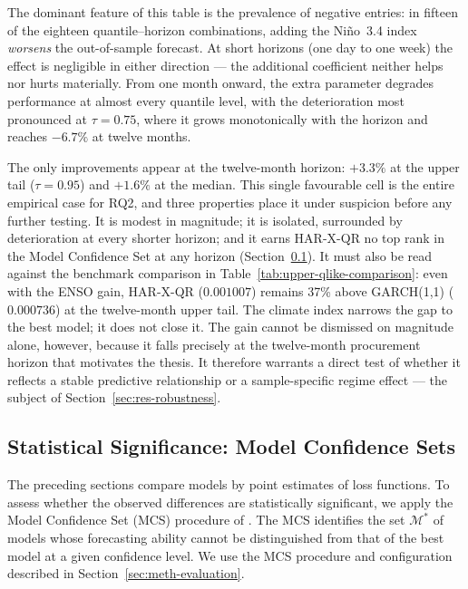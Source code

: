The dominant feature of this table is the prevalence of negative entries:
in fifteen of the eighteen quantile--horizon combinations, adding the
Ni\~no~3.4 index \emph{worsens} the out-of-sample forecast. At short
horizons (one day to one week) the effect is negligible in either
direction --- the additional coefficient neither helps nor hurts
materially. From one month onward, the extra parameter degrades
performance at almost every quantile level, with the deterioration most
pronounced at $\tau = 0.75$, where it grows monotonically with the
horizon and reaches $-6.7\%$ at twelve months.

The only improvements appear at the twelve-month horizon: $+3.3\%$ at the
upper tail ($\tau = 0.95$) and $+1.6\%$ at the median. This single
favourable cell is the entire empirical case for RQ2, and three
properties place it under suspicion before any further testing. It is
modest in magnitude; it is isolated, surrounded by deterioration at every
shorter horizon; and it earns HAR-X-QR no top rank in the Model
Confidence Set at any horizon (Section~\ref{sec:res-mcs}). It must also
be read against the benchmark comparison in
Table~\ref{tab:upper-qlike-comparison}: even with the ENSO gain, HAR-X-QR
($0.001007$) remains 37\% above GARCH(1,1) ($0.000736$) at the
twelve-month upper tail. The climate index narrows the gap to the best
model; it does not close it. The gain cannot be dismissed on magnitude
alone, however, because it falls precisely at the twelve-month
procurement horizon that motivates the thesis. It therefore warrants a
direct test of whether it reflects a stable predictive relationship or a
sample-specific regime effect --- the subject of
Section~\ref{sec:res-robustness}.

\subsection{Statistical Significance: Model Confidence Sets}
\label{sec:res-mcs}

The preceding sections compare models by point estimates of loss functions.
To assess whether the observed differences are statistically significant,
we apply the Model Confidence Set (MCS) procedure of
\textcite{hansen2011model}. The MCS identifies the set
$\mathcal{M}^{*}$ of models whose forecasting ability cannot be
distinguished from that of the best model at a given confidence level.
We use the MCS procedure and configuration described in
Section~\ref{sec:meth-evaluation}.

